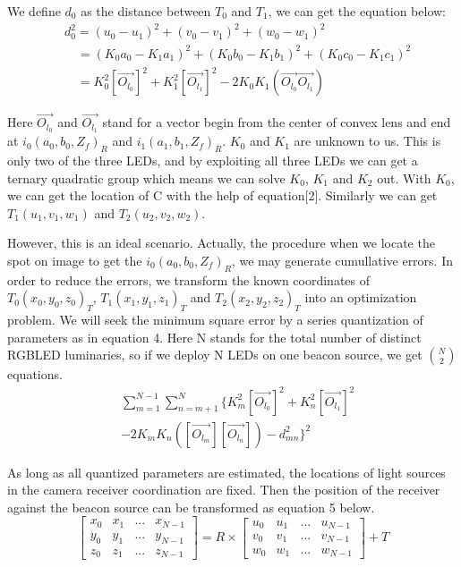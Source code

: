 \documentclass[conference]{IEEEtran}
\begin{document}
We define $d_0$ as the distance between $T_0$ and $T_1$, we can get the equation below:
	\begin{equation}
	\begin{split}
		&d_0^2 = (u_0 - u_1)^2 + (v_0 - v_1)^2 + (w_0 - w_1)^2  \\
		& \quad   =(K_0a_0-K_1a_1)^2 + (K_0b_0-K_1b_1)^2 +(K_0c_0-K_1c_1)^2  \\
		& \quad   =K_0^2[\vec{O_{l_0}}]^2 + K_1^2[\vec{O_{l_1}}]^2 - 2K_0K_1(\vec{O_{l_0}}\vec{O_{l_1}})
	\end{split}
	\end{equation}
	
Here $\vec{O_{l_0}}$ and $\vec{O_{l_1}}$ stand for a vector begin from the center of convex lens and end at $i_0(a_0, b_0, Z_f)_R$ and $i_1(a_1, b_1, Z_f)_R$. $K_0$ and $K_1$ are unknown to us. This is only two of the three LEDs, and by exploiting all three LEDs we can get a ternary quadratic group which means we can solve $K_0$, $K_1$ and $K_2$ out. With $K_0$, we can get the location of C with the help of equation[2]. Similarly we can get $T_1(u_1,v_1,w_1)$ and $T_2(u_2,v_2,w_2)$. 


However, this is an ideal scenario. Actually, the procedure when we locate the spot on image to get the $i_0(a_0, b_0, Z_f)_R$, we may generate cumullative errors. In order to reduce the errors, we transform the known coordinates of $T_0(x_0,y_0,z_0)_T$,  $T_1(x_1,y_1,z_1)_T$ and  $T_2(x_2,y_2,z_2)_T$ into an optimization problem. We will seek the minimum square error by a series quantization of parameters as in equation 4. Here N stands for the total number of distinct RGBLED luminaries, so if we deploy N LEDs on one beacon source, we get $\binom{N}{2}$ equations.
	\begin{equation}
	\begin{split}
	& \sum_{m=1}^{N-1}\sum_{n=m+1}^{N}\{K_m^2[\vec{O_{l_0}}]^2 + K_n^2[\vec{O_{l_1}}]^2 \\
	& - 2K_mK_n([\vec{O_{l_m}}][\vec{O_{l_n}}]) -d^2_{mn} \}^2
	\end{split}
	\end{equation}
	
As long as all quantized parameters are estimated, the locations of light sources in the camera receiver coordination are fixed. Then the position of the receiver against the beacon source can be transformed as equation 5 below.
	\begin{equation}
	\begin{bmatrix}
	x_0 & x_1 & ... & x_{N-1} \\
	y_0 & y_1 & ... & y_{N-1} \\
	z_0 & z_1 & ... & z_{N-1}
	\end{bmatrix}
	=R \times 
	\begin{bmatrix}
	u_0 & u_1 & ... & u_{N-1} \\
	v_0 & v_1 & ... & v_{N-1} \\
	w_0 & w_1 & ... & w_{N-1}
	\end{bmatrix} + T
	\end{equation}
	
\end{document}
